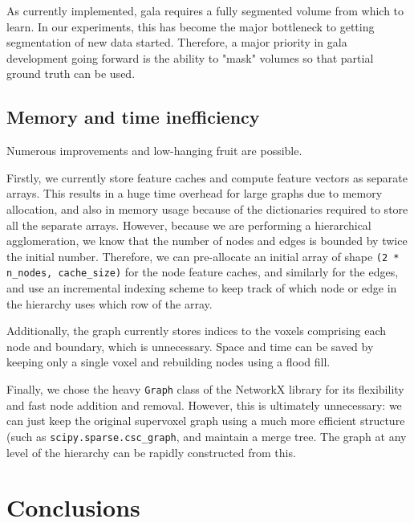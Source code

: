 \documentclass{frontiersSCNS} %
\begin{document}
As currently implemented, gala requires a fully segmented volume from which to learn.
In our experiments, this has become the major bottleneck to getting segmentation of new data started.
Therefore, a major priority in gala development going forward is the ability to "mask" volumes so that partial ground truth can be used.

\subsection{Memory and time inefficiency}

Numerous improvements and low-hanging fruit are possible.

Firstly, we currently store feature caches and compute feature vectors as separate arrays.
This results in a huge time overhead for large graphs due to memory allocation, and also in memory usage because of the dictionaries required to store all the separate arrays.
However, because we are performing a hierarchical agglomeration, we know that the number of nodes and edges is bounded by twice the initial number.
Therefore, we can pre-allocate an initial array of shape \texttt{(2 * n\_nodes, cache\_size)} for the node feature caches, and similarly for the edges, and use an incremental indexing scheme to keep track of which node or edge in the hierarchy uses which row of the array.

Additionally, the graph currently stores indices to the voxels comprising each node and boundary, which is unnecessary.
Space and time can be saved by keeping only a single voxel and rebuilding nodes using a flood fill.

Finally, we chose the heavy \texttt{Graph} class of the NetworkX library for its flexibility and fast node addition and removal.
However, this is ultimately unnecessary: we can just keep the original supervoxel graph using a much more efficient structure (such as \texttt{scipy.sparse.csc\_graph}, and maintain a merge tree.
The graph at any level of the hierarchy can be rapidly constructed from this.


\section{Conclusions}


\end{document}
